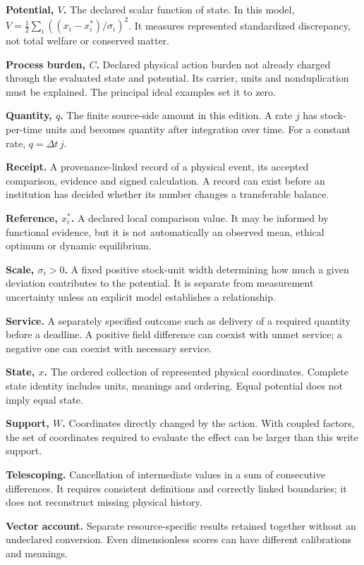 \textbf{Potential, $V$.} The declared scalar function of state. In this model, $V=\frac12\sum_i((x_i-x_i^*)/\sigma_i)^2$. It measures represented standardized discrepancy, not total welfare or conserved matter.

\textbf{Process burden, $C$.} Declared physical action burden not already charged through the evaluated state and potential. Its carrier, units and nonduplication must be explained. The principal ideal examples set it to zero.

\textbf{Quantity, $q$.} The finite source-side amount in this edition. A rate $j$ has stock-per-time units and becomes quantity after integration over time. For a constant rate, $q=\Delta t\,j$.

\textbf{Receipt.} A provenance-linked record of a physical event, its accepted comparison, evidence and signed calculation. A record can exist before an institution has decided whether its number changes a transferable balance.

\textbf{Reference, $x_i^*$.} A declared local comparison value. It may be informed by functional evidence, but it is not automatically an observed mean, ethical optimum or dynamic equilibrium.

\textbf{Scale, $\sigma_i>0$.} A fixed positive stock-unit width determining how much a given deviation contributes to the potential. It is separate from measurement uncertainty unless an explicit model establishes a relationship.

\textbf{Service.} A separately specified outcome such as delivery of a required quantity before a deadline. A positive field difference can coexist with unmet service; a negative one can coexist with necessary service.

\textbf{State, $x$.} The ordered collection of represented physical coordinates. Complete state identity includes units, meanings and ordering. Equal potential does not imply equal state.

\textbf{Support, $W$.} Coordinates directly changed by the action. With coupled factors, the set of coordinates required to evaluate the effect can be larger than this write support.

\textbf{Telescoping.} Cancellation of intermediate values in a sum of consecutive differences. It requires consistent definitions and correctly linked boundaries; it does not reconstruct missing physical history.

\textbf{Vector account.} Separate resource-specific results retained together without an undeclared conversion. Even dimensionless scores can have different calibrations and meanings.

